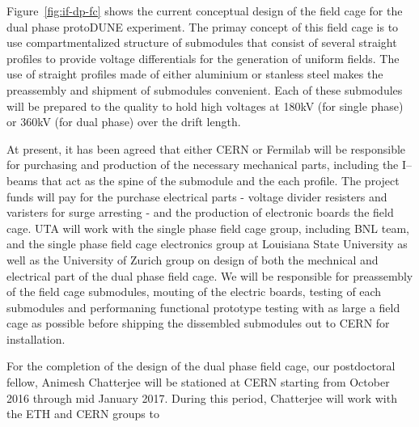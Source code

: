 Figure~\ref{fig:if-dp-fc} shows the current conceptual design of the field cage for the dual phase protoDUNE experiment.   The primay concept of this field cage is to use compartmentalized structure of submodules that consist of several straight profiles to provide voltage differentials for the generation of uniform fields.   The use of straight profiles made of either aluminium or stanless steel makes the preassembly and shipment of submodules convenient.   Each of these submodules will be prepared to the quality to hold high voltages at 180kV (for single phase) or  360kV (for dual phase) over the drift length.  

At present, it has been agreed that either CERN or Fermilab will be responsible for purchasing and production of the necessary mechanical parts, including the I--beams that act as the spine of the submodule and the each profile.  The project funds will pay for the purchase electrical parts - voltage divider resisters and varisters for surge arresting - and the production of electronic boards the field cage.  UTA will work with the single phase field cage group, including BNL team, and the single phase field cage electronics group at Louisiana State University as well as the University of Zurich group on design of both the mechnical and electrical part of the dual phase field cage.   We will be responsible for preassembly of the field cage submodules, mouting of the electric boards, testing of each submodules and performaning functional prototype testing with as large a field cage as possible before shipping the dissembled submodules out to CERN for installation.

For the completion of the design of the dual phase field cage, our postdoctoral fellow, Animesh Chatterjee will be stationed at CERN starting from October 2016 through mid January 2017.   During this period, Chatterjee will work with the ETH and CERN groups to  
